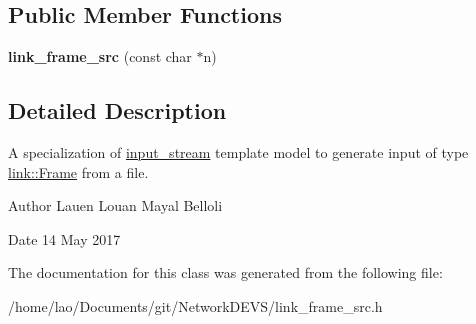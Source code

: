 \subsection*{Public Member Functions}
\begin{DoxyCompactItemize}
\item 
{\bfseries link\+\_\+frame\+\_\+src} (const char $\ast$n)\hypertarget{classlink__frame__src_a00b6c188c3a83d67f80bcf1a227c230c}{}\label{classlink__frame__src_a00b6c188c3a83d67f80bcf1a227c230c}

\end{DoxyCompactItemize}


\subsection{Detailed Description}
A specialization of \hyperlink{classinput__stream}{input\+\_\+stream} template model to generate input of type \hyperlink{structlink_1_1Frame}{link\+::\+Frame} from a file. 

\begin{DoxyAuthor}{Author}
Lauen Louan Mayal Belloli 
\end{DoxyAuthor}
\begin{DoxyDate}{Date}
14 May 2017 
\end{DoxyDate}


The documentation for this class was generated from the following file\+:\begin{DoxyCompactItemize}
\item 
/home/lao/\+Documents/git/\+Network\+D\+E\+V\+S/link\+\_\+frame\+\_\+src.\+h\end{DoxyCompactItemize}
